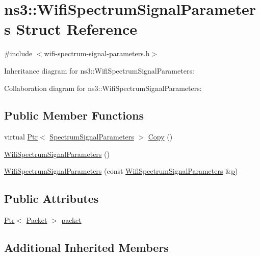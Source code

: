 \hypertarget{structns3_1_1WifiSpectrumSignalParameters}{}\section{ns3\+:\+:Wifi\+Spectrum\+Signal\+Parameters Struct Reference}
\label{structns3_1_1WifiSpectrumSignalParameters}


{\ttfamily \#include $<$wifi-\/spectrum-\/signal-\/parameters.\+h$>$}



Inheritance diagram for ns3\+:\+:Wifi\+Spectrum\+Signal\+Parameters\+:


Collaboration diagram for ns3\+:\+:Wifi\+Spectrum\+Signal\+Parameters\+:
\subsection*{Public Member Functions}
\begin{DoxyCompactItemize}
\item 
virtual \hyperlink{classns3_1_1Ptr}{Ptr}$<$ \hyperlink{structns3_1_1SpectrumSignalParameters}{Spectrum\+Signal\+Parameters} $>$ \hyperlink{structns3_1_1WifiSpectrumSignalParameters_a01bb8640ec9f825e7df8c9ca7ff7e680}{Copy} ()
\item 
\hyperlink{structns3_1_1WifiSpectrumSignalParameters_a61e240bf21e87d284861aa5d85e91f3a}{Wifi\+Spectrum\+Signal\+Parameters} ()
\item 
\hyperlink{structns3_1_1WifiSpectrumSignalParameters_a8a4dc1fce34e029804baba7c7d4a93ef}{Wifi\+Spectrum\+Signal\+Parameters} (const \hyperlink{structns3_1_1WifiSpectrumSignalParameters}{Wifi\+Spectrum\+Signal\+Parameters} \&\hyperlink{lte__link__budget__x2__handover__measures_8m_ac9de518908a968428863f829398a4e62}{p})
\end{DoxyCompactItemize}
\subsection*{Public Attributes}
\begin{DoxyCompactItemize}
\item 
\hyperlink{classns3_1_1Ptr}{Ptr}$<$ \hyperlink{classns3_1_1Packet}{Packet} $>$ \hyperlink{structns3_1_1WifiSpectrumSignalParameters_a3302ca9118103a1f4f69b1c10dddb979}{packet}
\end{DoxyCompactItemize}
\subsection*{Additional Inherited Members}


